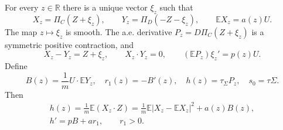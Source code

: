 \begin{lemma}\label{lem:biased-projections}
For every $z\in\mathbb{R}$ there is a unique vector $\xi_z$ such that
\begin{equation}
X_z=\Pi_C(Z+\xi_z),\qquad Y_z=\Pi_D(-Z-\xi_z),\qquad
\mathbb{E}X_z=a(z)U.\label{eq:centered-projection-bias}
\end{equation}
The map $z\mapsto\xi_z$ is smooth. The a.e. derivative $P_z=D\Pi_C(Z+\xi_z)$ is a symmetric positive contraction, and
\[
X_z-Y_z=Z+\xi_z,\qquad X_z\cdot Y_z=0,\qquad
(\mathbb{E}P_z)\xi_z'=p(z)U.
\]
Define
\[
B(z)=\frac1m U\cdot\mathbb{E}Y_z,\quad r_1(z)=-B'(z),\quad
h(z)=\tau_\Sigma P_z,\quad s_0=\tau\Sigma.
\]
Then
\begin{equation}
\begin{gathered}
h(z)=\frac1m\mathbb{E}(X_z\cdot Z)
=\frac1m\mathbb{E}|X_z-\mathbb{E}X_z|^2+a(z)B(z),\\
h'=pB+ar_1,\qquad r_1>0.
\end{gathered}\label{eq:first-projection-moment}
\end{equation}
\end{lemma}
